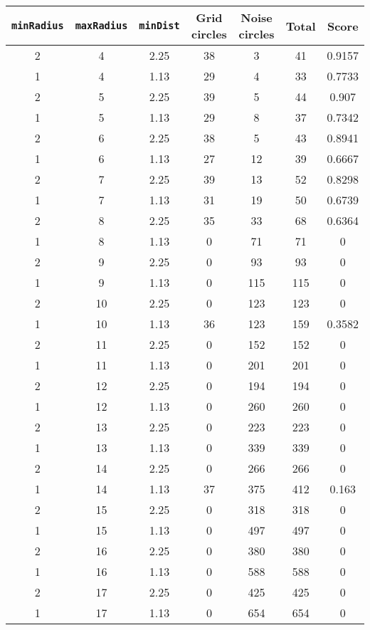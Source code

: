 \documentclass[letterpaper, 12pt]{article}
\begin{document}
\begin{longtable}{|c|c|c|c|c|c|c|}
\hline
\textbf{\texttt{minRadius}} & \textbf{\texttt{maxRadius}} & \textbf{\texttt{minDist}} & \textbf{Grid circles} & \textbf{Noise circles} & \textbf{Total} & \textbf{Score} \\
\hline
2 & 4 & 2.25 & 38 & 3 & 41 & 0.9157 \\
\hline
1 & 4 & 1.13 & 29 & 4 & 33 & 0.7733 \\
\hline
2 & 5 & 2.25 & 39 & 5 & 44 & 0.907 \\
\hline
1 & 5 & 1.13 & 29 & 8 & 37 & 0.7342 \\
\hline
2 & 6 & 2.25 & 38 & 5 & 43 & 0.8941 \\
\hline
1 & 6 & 1.13 & 27 & 12 & 39 & 0.6667 \\
\hline
2 & 7 & 2.25 & 39 & 13 & 52 & 0.8298 \\
\hline
1 & 7 & 1.13 & 31 & 19 & 50 & 0.6739 \\
\hline
2 & 8 & 2.25 & 35 & 33 & 68 & 0.6364 \\
\hline
1 & 8 & 1.13 & 0 & 71 & 71 & 0 \\
\hline
2 & 9 & 2.25 & 0 & 93 & 93 & 0 \\
\hline
1 & 9 & 1.13 & 0 & 115 & 115 & 0 \\
\hline
2 & 10 & 2.25 & 0 & 123 & 123 & 0 \\
\hline
1 & 10 & 1.13 & 36 & 123 & 159 & 0.3582 \\
\hline
2 & 11 & 2.25 & 0 & 152 & 152 & 0 \\
\hline
1 & 11 & 1.13 & 0 & 201 & 201 & 0 \\
\hline
2 & 12 & 2.25 & 0 & 194 & 194 & 0 \\
\hline
1 & 12 & 1.13 & 0 & 260 & 260 & 0 \\
\hline
2 & 13 & 2.25 & 0 & 223 & 223 & 0 \\
\hline
1 & 13 & 1.13 & 0 & 339 & 339 & 0 \\
\hline
2 & 14 & 2.25 & 0 & 266 & 266 & 0 \\
\hline
1 & 14 & 1.13 & 37 & 375 & 412 & 0.163 \\
\hline
2 & 15 & 2.25 & 0 & 318 & 318 & 0 \\
\hline
1 & 15 & 1.13 & 0 & 497 & 497 & 0 \\
\hline
2 & 16 & 2.25 & 0 & 380 & 380 & 0 \\
\hline
1 & 16 & 1.13 & 0 & 588 & 588 & 0 \\
\hline
2 & 17 & 2.25 & 0 & 425 & 425 & 0 \\
\hline
1 & 17 & 1.13 & 0 & 654 & 654 & 0 \\

\end{longtable}
\end{document}
